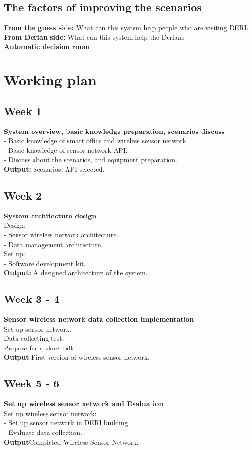 \documentclass[a4paper]{llncs}
\newcommand{\head}[1]{\textnormal {\textbf{#1}}}
\begin{document}
\subsection{The factors of improving the scenarios}
\head{From the guess side: }What can this system help  people who are visiting DERI.\\
\head{From Derian side: }What can this system help the Derians.\\
\head{Automatic decision room}
\section{Working plan}
\subsection{Week 1}
\head{System overview, basic knowledge preparation, scenarios discuss}\\
- Basic knowledge of smart office and wireless sensor network.\\
- Basic knowledge of sensor network API.\\   
- Discuss about the scenarios, and equipment preparation.\\
\head{Output: } Scenarios, API selected.
\subsection{Week 2}
\head{System architecture design}\\
Design:\\
- Sensor wireless network architecture.\\
- Data management architecture.\\ 
Set up:\\
- Software development kit.\\
\head{Output:} A designed architecture of the system.
\subsection{Week 3 - 4}
\head{Sensor wireless network data collection implementation}\\
Set up sensor network.\\
Data collecting test.\\
Prepare for a short talk.\\
\head{Output} First version of wireless sensor network.
\subsection{Week 5 - 6}
\head{Set up wireless sensor network and Evaluation}\\
Set up wireless sensor network:\\
 - Set up sensor network in DERI building.\\
 - Evaluate data collection.\\
\head{Output}Completed Wireless Sensor Network.
\end{document}
